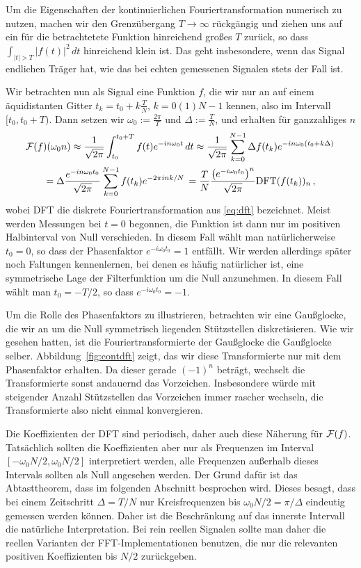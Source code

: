 Um die Eigenschaften der kontinuierlichen Fouriertransformation
numerisch zu nutzen, machen wir den Grenzübergang $T\to\infty$
rückgängig und ziehen uns auf ein für die betrachtetete Funktion
hinreichend großes $T$ zurück, so dass $\int_{\lvert t\rvert>T}\lvert
f(t)\rvert^2\, dt$ hinreichend klein ist. Das geht insbesondere, wenn
das Signal endlichen Träger hat, wie das bei echten gemessenen
Signalen stets der Fall ist.

Wir betrachten nun als Signal eine Funktion $f$, die wir nur an auf
einem äquidistanten Gitter $t_k = t_0 + k\frac{T}{N}$, $k=0(1)N-1$
kennen, also im Intervall $[t_0, t_0 + T)$. Dann setzen wir
$\omega_0:=\frac{2\pi}{T}$ und $\Delta := \frac{T}{N}$, und erhalten
für ganzzahliges $n$
\begin{multline}
  \label{eq:dftcont}
  \mathcal F(f)(\omega_0 n)\approx
  \frac{1}{\sqrt{2\pi}}\int_{t_0}^{t_0 + T} f(t)e^{-i n \omega_0 t}\, dt
  \approx
  \frac{1}{\sqrt{2\pi}}\sum_{k=0}^{N-1}
  \Delta f(t_k)
  e^{-i n\omega_0 \left(t_0 + k\Delta\right)}\,
  \\
  =   \Delta \frac{e^{-i n\omega_0 t_0}}{\sqrt{2\pi}}\sum_{k=0}^{N-1}
  f(t_k) e^{-2\pi i n k / N}\,
  =\frac{T}{N}\frac{\left(e^{-i\omega_0 t_0}\right)^n}{\sqrt{2\pi}} \text{DFT}(f(t_k))_n\,,
\end{multline}
wobei DFT die diskrete Fouriertransformation aus \eqref{eq:dft}
bezeichnet. Meist werden Messungen bei $t=0$ begonnen, die Funktion
ist dann nur im positiven Halbinterval von Null verschieden.  In
diesem Fall wählt man natürlicherweise $t_0 = 0$, so dass der Phasenfaktor
$e^{-i\omega_0 t_0} = 1$ entfällt. Wir werden allerdings später noch
Faltungen kennenlernen, bei denen es häufig natürlicher ist, eine
symmetrische Lage der Filterfunktion um die Null anzunehmen. In diesem
Fall wählt man $t_0 = -T/2$, so dass $e^{-i\omega_0 t_0} = -1$.

Um die Rolle des Phasenfaktors zu illustrieren, betrachten wir eine
Gaußglocke, die wir an um die Null symmetrisch liegenden Stützstellen diskretisieren. Wie wir gesehen hatten, ist die Fouriertransformierte
der Gaußglocke die Gaußglocke selber. Abbildung~\ref{fig:contdft} zeigt,
das wir diese Transformierte nur mit dem Phasenfaktor erhalten. Da
dieser gerade $(-1)^n$ beträgt, wechselt die Transformierte sonst andauernd
das Vorzeichen. Insbesondere würde mit steigender Anzahl Stützstellen das
Vorzeichen immer rascher wechseln, die Transformierte also nicht einmal
konvergieren.

Die Koeffizienten der DFT sind periodisch, daher auch diese Näherung
für $\mathcal F(f)$. Tatsächlich sollten die Koeffizienten aber nur als
Frequenzen im Interval $[-\omega_0 N/2,\omega_0 N/2]$ interpretiert
werden, alle Frequenzen außerhalb dieses Intervals sollten als Null
angesehen werden. Der Grund dafür ist das Abtasttheorem, dass im
folgenden Abschnitt besprochen wird. Dieses besagt, dass bei einem
Zeitschritt $\Delta=T/N$ nur Kreisfrequenzen bis $\omega_0 N/2 =
\pi/\Delta$ eindeutig gemessen werden können. Daher ist die
Beschränkung auf das innerste Intervall die natürliche
Interpretation. Bei rein reellen Signalen sollte man daher
die reellen Varianten der FFT-Implementationen benutzen, die
nur die relevanten positiven Koeffizienten bis $N/2$
zurückgeben.

